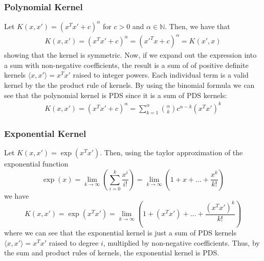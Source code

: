 \documentclass[12pt]{article}
\begin{document}
\subsubsection*{Polynomial Kernel}
Let $K(x, x') = (x^Tx' + c)^\alpha$ for $c > 0$ and $\alpha \in \mathbb{N}$. Then, we have that
\begin{align*}
    K(x, x') = (x^Tx' + c)^\alpha = (x'^Tx + c)^\alpha = K(x', x)
\end{align*}
showing that the kernel is symmetric. Now, if we expand out the expression into a sum with 
non-negative coefficients, the result is a sum of of positive definite kernels $\langle x,x'\rangle=x^Tx'$
raised to integer powers. Each individual term is a valid kernel by the the product rule of kernels.
By using the binomial formula we can see that the polynomial kernel is PDS since it is a sum of PDS kernels:
\begin{align*}
    K(x, x') = (x^T x' + c)^\alpha = \sum_{k=1}^\alpha \binom{\alpha}{k} c^{\alpha - k}(x^Tx')^k
\end{align*}

\subsubsection*{Exponential Kernel}
Let $K(x, x') = \exp(x^Tx')$. Then, using the taylor approximation of the exponential function
\[
    \exp{(x)} = \lim_{k \to \infty} (\sum_{i=0}^k \frac{x^i}{i!})  = \lim_{k \to \infty} (1 + x + \dots + \frac{x^k}{k!})
\]
we have 
\[
    K(x,x') = \exp{(x^Tx')} = \lim_{k \to \infty} (1 + (x^Tx') + \dots + \frac{(x^Tx')^k}{k!})
\]
where we can see that the exponential kernel is just a sum of PDS kernels $\langle x,x'\rangle=x^Tx'$
raised to degree $i$, multiplied by non-negative coefficients. Thus, by the sum and product rules of 
kernels, the exponential kernel is PDS.
\end{document}
